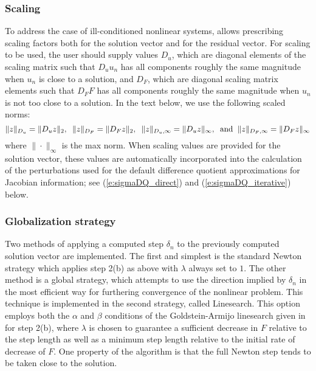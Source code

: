 \subsubsection*{Scaling}
To address the case of ill-conditioned nonlinear systems, {\kinsol} allows 
prescribing scaling factors both for the solution vector and for the residual 
vector.
For scaling to be used, the user should supply values $D_u$, which are diagonal 
elements of the scaling matrix such that $D_u u_n$ has all components roughly 
the same magnitude when $u_n$ is close to a solution, and $D_F$, which are diagonal
scaling matrix elements such that $D_F F$ has all components roughly the same 
magnitude when $u_n$ is not too close to a solution. 
In the text below, we use the following scaled norms:
\begin{equation}
\|z\|_{D_u} = \|D_u z\|_2, \;\; \|z\|_{D_F} = \|D_F z\|_2, \;\;
\|z\|_{D_u,\infty} = \|D_u z\|_{\infty}, \;\; {\rm and} \;\;
\|z\|_{D_F,\infty} = \|D_F z\|_{\infty}
\end{equation}
where $\| \cdot \|_{\infty}$ is the max norm.  When scaling values are provided 
for the solution vector, these values are automatically incorporated into the 
calculation of the perturbations used for the default difference quotient 
approximations for Jacobian information; see (\ref{e:sigmaDQ_direct}) and 
(\ref{e:sigmaDQ_iterative}) below.


\subsubsection*{Globalization strategy}
Two methods of applying a computed step $\delta_n$ to the
previously computed solution vector are implemented. The first and
simplest is the standard Newton strategy which applies step 2(b) as
above with $\lambda$ always set to $1$. The other method is a
global strategy, which attempts to use the direction implied by
$\delta_n$ in the most efficient way for furthering convergence of
the nonlinear problem. This technique is implemented in the second
strategy, called Linesearch.  This option employs both the
$\alpha$ and $\beta$ conditions of the Goldstein-Armijo linesearch
given in \cite{DeSc:96} for step 2(b), where $\lambda$ is chosen
to guarantee a sufficient decrease in $F$ relative to the step
length as well as a minimum step length relative to the initial
rate of decrease of $F$.  One property of the algorithm is that
the full Newton step tends to be taken close to the solution.  


